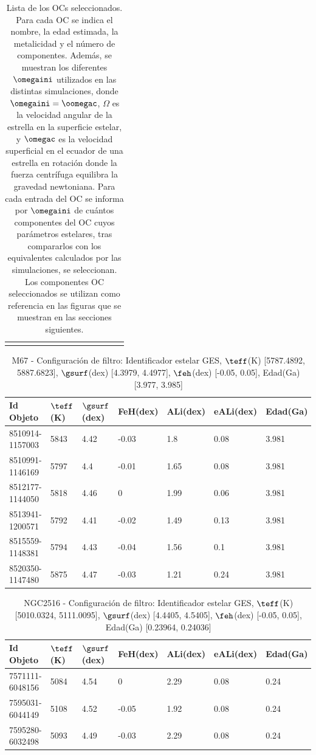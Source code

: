 \begin{longtable}[c]{|l l l l || c c c c c c c c c c|}
	\hline
	\caption{Lista de los OCs seleccionados. Para cada OC se indica el nombre, la edad estimada, la metalicidad y el número de componentes. Además, se muestran los diferentes $\omegaini$ utilizados en las distintas simulaciones, donde $\omegaini = \oomegac$, $\Omega$ es la velocidad angular de la estrella en la superficie estelar, y $\omegac$ es la velocidad superficial en el ecuador de una estrella en rotación donde la fuerza centrífuga equilibra la gravedad newtoniana. Para cada entrada del OC se informa por $\omegaini$ de cuántos componentes del OC cuyos parámetros estelares, tras compararlos con los equivalentes calculados por las simulaciones, se seleccionan. Los componentes OC seleccionados se utilizan como referencia en las figuras que se muestran en las secciones siguientes.}
	\label{tab:oc_reduced_list}	
\end{longtable}
\newpage
{}
\recalctypearea


\begin{table}
	\centering
	\begin{tabular}{l l l l l l l} 
		\hline
		Id Objeto & $\teff$(K) & $\gsurf$(dex) & FeH(dex) & ALi(dex) & eALi(dex) & Edad(Ga)\\
		\hline
		8510914-1157003 & 5843 & 4.42 & -0.03 & 1.8 & 0.08 & 3.981\\ 
		8510991-1146169 & 5797 & 4.4 & -0.01 & 1.65 & 0.08 & 3.981\\ 
		8512177-1144050 & 5818 & 4.46 & 0 & 1.99 & 0.06 & 3.981\\ 
		8513941-1200571 & 5792 & 4.41 & -0.02 & 1.49 & 0.13 & 3.981\\ 
		8515559-1148381 & 5794 & 4.43 & -0.04 & 1.56 & 0.1 & 3.981\\ 
		8520350-1147480 & 5875 & 4.47 & -0.03 & 1.21 & 0.24 & 3.981\\ 
		\hline
	\end{tabular}
	\caption{M67 - Configuración de filtro: Identificador estelar GES, $\teff$(K) [5787.4892, 5887.6823], $\gsurf$(dex) [4.3979, 4.4977], $\feh$(dex) [-0.05, 0.05], Edad(Ga) [3.977, 3.985]}
	\label{tab:oc_m67}
\end{table}

\begin{table}
	\centering
	\begin{tabular}{l l l l l l l} 
		\hline
		Id Objeto & $\teff$(K) & $\gsurf$(dex) & FeH(dex) & ALi(dex) & eALi(dex) & Edad(Ga)\\
		\hline
		7571111-6048156 & 5084 & 4.54 & 0 & 2.29 & 0.08 & 0.24\\ 
		7595031-6044149 & 5108 & 4.52 & -0.05 & 1.92 & 0.08 & 0.24\\ 
		7595280-6032498 & 5093 & 4.49 & -0.03 & 2.29 & 0.08 & 0.24\\ 
		\hline
	\end{tabular}
	\caption{NGC2516 - Configuración de filtro: Identificador estelar GES, $\teff$(K) [5010.0324, 5111.0095], $\gsurf$(dex) [4.4405, 4.5405], $\feh$(dex) [-0.05, 0.05], Edad(Ga) [0.23964, 0.24036]}
	\label{tab:oc_ngc2516}
\end{table}



